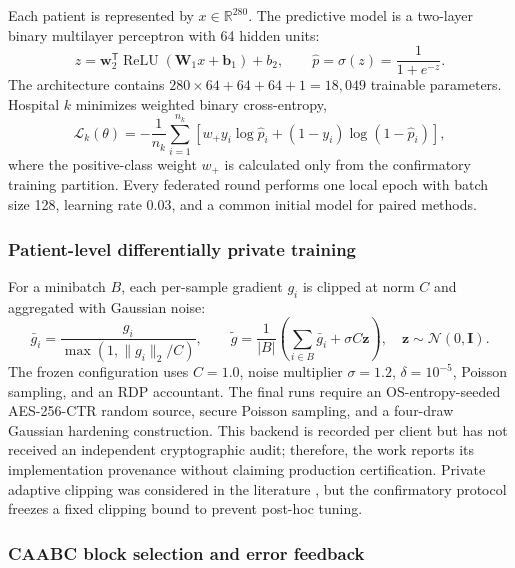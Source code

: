 Each patient is represented by $x\in\mathbb{R}^{280}$. The predictive model is a two-layer binary multilayer perceptron with 64 hidden units:
\begin{equation}
    z = \mathbf{w}_2^{\mathsf T}\operatorname{ReLU}(\mathbf{W}_1x+\mathbf{b}_1)+b_2,
    \qquad
    \hat p = \sigma(z)=\frac{1}{1+e^{-z}}.
    \label{eq:mlp-model}
\end{equation}
The architecture contains $280\times64+64+64+1=18{,}049$ trainable parameters. Hospital $k$ minimizes weighted binary cross-entropy,
\begin{equation}
    \mathcal{L}_k(\theta)= -\frac{1}{n_k}\sum_{i=1}^{n_k}
    \left[w_{+}y_i\log\hat p_i+(1-y_i)\log(1-\hat p_i)\right],
    \label{eq:weighted-bce}
\end{equation}
where the positive-class weight $w_{+}$ is calculated only from the confirmatory training partition. Every federated round performs one local epoch with batch size 128, learning rate 0.03, and a common initial model for paired methods.

\subsubsection{Patient-level differentially private training}

For a minibatch $B$, each per-sample gradient $g_i$ is clipped at norm $C$ and aggregated with Gaussian noise:
\begin{equation}
    \bar g_i = \frac{g_i}{\max(1,\lVert g_i\rVert_2/C)},
    \qquad
    \widetilde g = \frac{1}{|B|}\left(\sum_{i\in B}\bar g_i + \sigma C\mathbf{z}\right),
    \quad \mathbf{z}\sim\mathcal{N}(0,\mathbf{I}).
    \label{eq:dpsgd}
\end{equation}
The frozen configuration uses $C=1.0$, noise multiplier $\sigma=1.2$, $\delta=10^{-5}$, Poisson sampling, and an RDP accountant. The final runs require an OS-entropy-seeded AES-256-CTR random source, secure Poisson sampling, and a four-draw Gaussian hardening construction. This backend is recorded per client but has not received an independent cryptographic audit; therefore, the work reports its implementation provenance without claiming production certification. Private adaptive clipping was considered in the literature \cite{andrew2021adaptive}, but the confirmatory protocol freezes a fixed clipping bound to prevent post-hoc tuning.

\subsubsection{CAABC block selection and error feedback}

